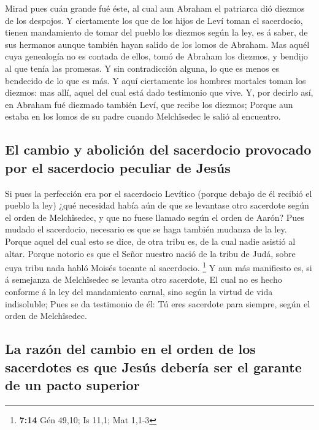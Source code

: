  Mirad pues cuán grande fué éste, al cual aun Abraham el
patriarca dió diezmos de los despojos.  Y ciertamente los
que de los hijos de Leví toman el sacerdocio, tienen mandamiento de
tomar del pueblo los diezmos según la ley, es á saber, de sus hermanos
aunque también hayan salido de los lomos de Abraham.  Mas
aquél cuya genealogía no es contada de ellos, tomó de Abraham los
diezmos, y bendijo al que tenía las promesas.  Y sin
contradicción alguna, lo que es menos es bendecido de lo que es más.
 Y aquí ciertamente los hombres mortales toman los
diezmos: mas allí, aquel del cual está dado testimonio que vive.
 Y, por decirlo así, en Abraham fué diezmado también Leví,
que recibe los diezmos;  Porque aun estaba en los lomos
de su padre cuando Melchîsedec le salió al encuentro.

\hypertarget{el-cambio-y-aboliciuxf3n-del-sacerdocio-provocado-por-el-sacerdocio-peculiar-de-jesuxfas}{%
\subsection{El cambio y abolición del sacerdocio provocado por el
sacerdocio peculiar de
Jesús}\label{el-cambio-y-aboliciuxf3n-del-sacerdocio-provocado-por-el-sacerdocio-peculiar-de-jesuxfas}}

 Si pues la perfección era por el sacerdocio Levítico
(porque debajo de él recibió el pueblo la ley) ¿qué necesidad había aún
de que se levantase otro sacerdote según el orden de Melchîsedec, y que
no fuese llamado según el orden de Aarón?  Pues mudado el
sacerdocio, necesario es que se haga también mudanza de la ley.
 Porque aquel del cual esto se dice, de otra tribu es, de
la cual nadie asistió al altar.  Porque notorio es que el
Señor nuestro nació de la tribu de Judá, sobre cuya tribu nada habló
Moisés tocante al sacerdocio. \footnote{\textbf{7:14} Gén 49,10; Is
  11,1; Mat 1,1-3}  Y aun más manifiesto es, si á
semejanza de Melchîsedec se levanta otro sacerdote,  El
cual no es hecho conforme á la ley del mandamiento carnal, sino según la
virtud de vida indisoluble;  Pues se da testimonio de él:
Tú eres sacerdote para siempre, según el orden de Melchîsedec.

\hypertarget{la-razuxf3n-del-cambio-en-el-orden-de-los-sacerdotes-es-que-jesuxfas-deberuxeda-ser-el-garante-de-un-pacto-superior}{%
\subsection{La razón del cambio en el orden de los sacerdotes es que
Jesús debería ser el garante de un pacto
superior}\label{la-razuxf3n-del-cambio-en-el-orden-de-los-sacerdotes-es-que-jesuxfas-deberuxeda-ser-el-garante-de-un-pacto-superior}}

